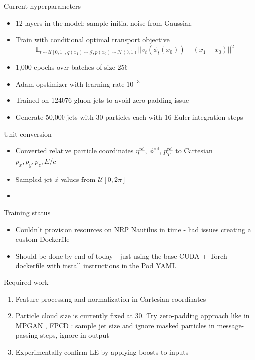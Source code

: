 \documentclass[handout, aspectratio=169,xcolor=dvipsnames]{beamer}
\begin{document}
\begin{frame}{Current hyperparameters}
    \begin{itemize}
        \item 12 layers in the model; sample initial noise from Gaussian
        \item Train with conditional optimal transport objective \begin{equation*}
            \mathbb{E}_{t \sim \mathcal{U}[0, 1], q(x_1) \sim \mathcal{J}, p(x_0) \sim \mathcal{N}(0, 1)} || v_t(\phi_t(x_0)) - (x_1 - x_0) ||^2
        \end{equation*}
        \item 1,000 epochs over batches of size 256
        \item Adam opstimizer with learning rate $10^{-3}$
        \item Trained on 124076 gluon jets to avoid zero-padding issue
        \item Generate 50,000 jets with 30 particles each with 16 Euler integration steps
    \end{itemize}
\end{frame}

\begin{frame}{Unit conversion}
    \begin{itemize}
        \item Converted relative particle coordinates $\eta^\text{rel}$, $\phi^\text{rel}$, $p_T^\text{rel}$ to Cartesian $p_x, p_y, p_z, E/c$
        \item Sampled jet $\phi$ values from $\mathcal{U}[0, 2\pi]$
        \item 
    \end{itemize}
\end{frame}

\begin{frame}{Training status}
    \begin{itemize}
        \item Couldn't provision resources on NRP Nautilus in time - had issues creating a custom Dockerfile
        \item Should be done by end of today - just using the base CUDA + Torch dockerfile with install instructions in the Pod YAML
    \end{itemize}
\end{frame}

\begin{frame}{Required work}
    \begin{enumerate}
        \item Feature processing and normalization in Cartesian coordinates
        \item Particle cloud size is currently fixed at 30. Try zero-padding approach like in MPGAN \cite{kansalParticleCloudGeneration2022}, FPCD \cite{mikuniFastPointCloud2023}: sample jet size and ignore masked particles in message-passing steps, ignore in output
        \item Experimentally confirm LE by applying boosts to inputs
    \end{enumerate}
\end{frame}
\end{document}
